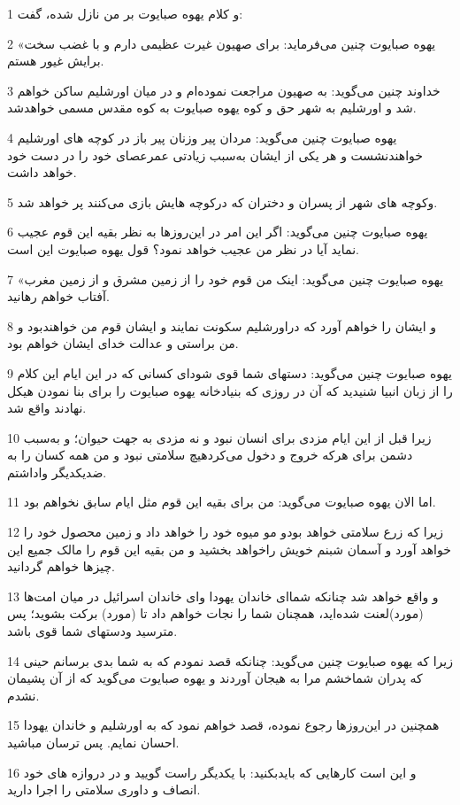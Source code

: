 \par 1 و کلام یهوه صبایوت بر من نازل شده، گفت:
\par 2 «یهوه صبایوت چنین می‌فرماید: برای صهیون غیرت عظیمی دارم و با غضب سخت برایش غیور هستم.
\par 3 خداوند چنین می‌گوید: به صهیون مراجعت نموده‌ام و در میان اورشلیم ساکن خواهم شد و اورشلیم به شهر حق و کوه یهوه صبایوت به کوه مقدس مسمی خواهدشد.
\par 4 یهوه صبایوت چنین می‌گوید: مردان پیر وزنان پیر باز در کوچه های اورشلیم خواهندنشست و هر یکی از ایشان به‌سبب زیادتی عمرعصای خود را در دست خود خواهد داشت.
\par 5 وکوچه های شهر از پسران و دختران که درکوچه هایش بازی می‌کنند پر خواهد شد.
\par 6 یهوه صبایوت چنین می‌گوید: اگر این امر در این‌روزها به نظر بقیه این قوم عجیب نماید آیا در نظر من عجیب خواهد نمود؟ قول یهوه صبایوت این است.
\par 7 «یهوه صبایوت چنین می‌گوید: اینک من قوم خود را از زمین مشرق و از زمین مغرب آفتاب خواهم رهانید.
\par 8 و ایشان را خواهم آورد که دراورشلیم سکونت نمایند و ایشان قوم من خواهندبود و من براستی و عدالت خدای ایشان خواهم بود.
\par 9 یهوه صبایوت چنین می‌گوید: دستهای شما قوی شود‌ای کسانی که در این ایام این کلام را از زبان انبیا شنیدید که آن در روزی که بنیادخانه یهوه صبایوت را برای بنا نمودن هیکل نهادند واقع شد.
\par 10 زیرا قبل از این ایام مزدی برای انسان نبود و نه مزدی به جهت حیوان؛ و به‌سبب دشمن برای هر‌که خروج و دخول می‌کردهیچ سلامتی نبود و من همه کسان را به ضدیکدیگر واداشتم.
\par 11 اما الان یهوه صبایوت می‌گوید: من برای بقیه این قوم مثل ایام سابق نخواهم بود.
\par 12 زیرا که زرع سلامتی خواهد بودو مو میوه خود را خواهد داد و زمین محصول خود را خواهد آورد و آسمان شبنم خویش راخواهد بخشید و من بقیه این قوم را مالک جمیع این چیزها خواهم گردانید.
\par 13 و واقع خواهد شد چنانکه شما‌ای خاندان یهودا وای خاندان اسرائیل در میان امت‌ها (مورد)لعنت شده‌اید، همچنان شما را نجات خواهم داد تا (مورد) برکت بشوید؛ پس مترسید ودستهای شما قوی باشد.
\par 14 زیرا که یهوه صبایوت چنین می‌گوید: چنانکه قصد نمودم که به شما بدی برسانم حینی که پدران شماخشم مرا به هیجان آوردند و یهوه صبایوت می‌گوید که از آن پشیمان نشدم.
\par 15 همچنین در این‌روزها رجوع نموده، قصد خواهم نمود که به اورشلیم و خاندان یهودا احسان نمایم. پس ترسان مباشید.
\par 16 و این است کارهایی که بایدبکنید: با یکدیگر راست گویید و در دروازه های خود انصاف و داوری سلامتی را اجرا دارید.

